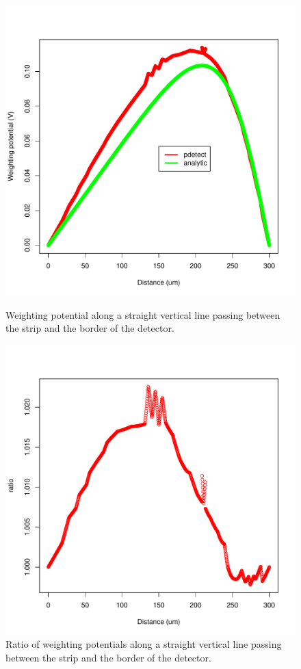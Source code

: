 \documentclass[11pt]{article}
\begin{document}
	\begin{figure}[H]
		\begin{minipage}[b]{.46\linewidth}
			\center
			\includegraphics[scale=0.5]{images/annexe/middle-pitch.pdf}
			\caption{Weighting potential along a straight vertical line passing between the strip and
					the border of the detector.}
			\label{fig:mid_pitch}
		\end{minipage} \hfill
		\begin{minipage}[b]{.46\linewidth}
			\center
			\includegraphics[scale=0.5]{images/annexe/middle-pitch_ratio.pdf}
			\caption{Ratio of weighting potentials along a straight vertical line passing between the
					strip and the border of the detector.}
			\label{fig:mid_pitch_ratio}
		\end{minipage}
	\end{figure}
\end{document}
